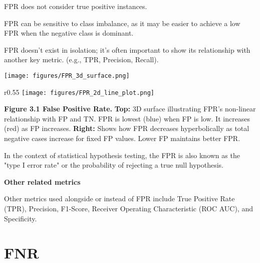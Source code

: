 {
\item FPR does not consider true positive instances.
\item FPR can be sensitive to class imbalance, as it may be easier to achieve a low FPR when the negative class is dominant.
\item FPR doesn't exist in isolation; it's often important to show its relationship with another key metric. (e.g., TPR, Precision, Recall).
}


\clearpage
\thispagestyle{customstyle}


\begin{figure*}[ht!]
    \centering
    \texttt{[image: figures/FPR\_3d\_surface.png]}
    \label{fig1}
\end{figure*}

\begin{wrapfigure}{r}{0.55\textwidth}
    \centering
    \vspace{-20pt} %
    \texttt{[image: figures/FPR\_2d\_line\_plot.png]} %
\end{wrapfigure}

\textbf{Figure 3.1 False Positive Rate.} 
\textbf{Top:}
3D surface illustrating FPR's non-linear relationship with FP and TN. FPR is lowest (blue) when FP is low. It increases (red) as FP increases.
\textbf{Right:}
Shows how FPR decreases hyperbolically as total negative cases increase for fixed FP values. Lower FP maintains better FPR.


{
In the context of statistical hypothesis testing, the FPR is also known as the "type I error rate" or the probability of rejecting a true null hypothesis.
}

\textbf{Other related metrics}

Other metrics used alongside or instead of FPR include True Positive Rate (TPR), Precision, F1-Score, Receiver Operating Characteristic (ROC AUC), and Specificity.


\clearpage
\section{FNR}
